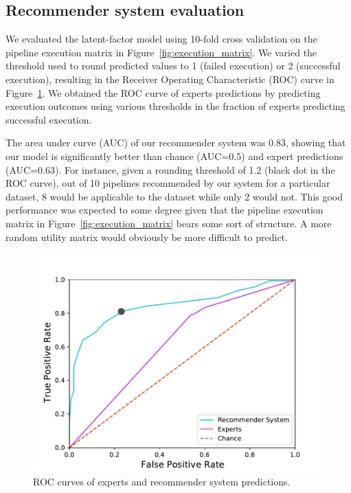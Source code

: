 \documentclass[conference]{IEEEtran}
\begin{document}

\subsection{Recommender system evaluation} 

We evaluated the latent-factor model using 10-fold cross validation on the
pipeline execution matrix in Figure~\ref{fig:execution_matrix}. We varied
the threshold used to round predicted values to 1 (failed execution) or 2
(successful execution), resulting in the Receiver Operating Characteristic
(ROC) curve  in Figure~\ref{fig:roc-curve}. We obtained the ROC curve of
experts predictions by predicting execution outcomes using various
thresholds in the fraction of experts predicting successful execution. 

The area under curve (AUC) of our recommender system was 0.83, showing that
our model is significantly better than chance (AUC=0.5) and expert
predictions (AUC=0.63). For instance, given a rounding threshold of 1.2
(black dot in the ROC curve), out of 10 pipelines
recommended by our system for a particular dataset, 8 would be applicable to
the dataset while only 2 would not. This good performance was expected to some degree given that the pipeline execution matrix in
Figure~\ref{fig:execution_matrix} bears some sort of structure. 
A more random utility matrix would obviously be more difficult to predict.

\begin{figure}
\centering
  \includegraphics[width=\columnwidth]{figures/ROC Curve.pdf}
  \caption{ROC curves of experts and recommender system predictions.}
  \label{fig:roc-curve}
\end{figure}
\end{document}
